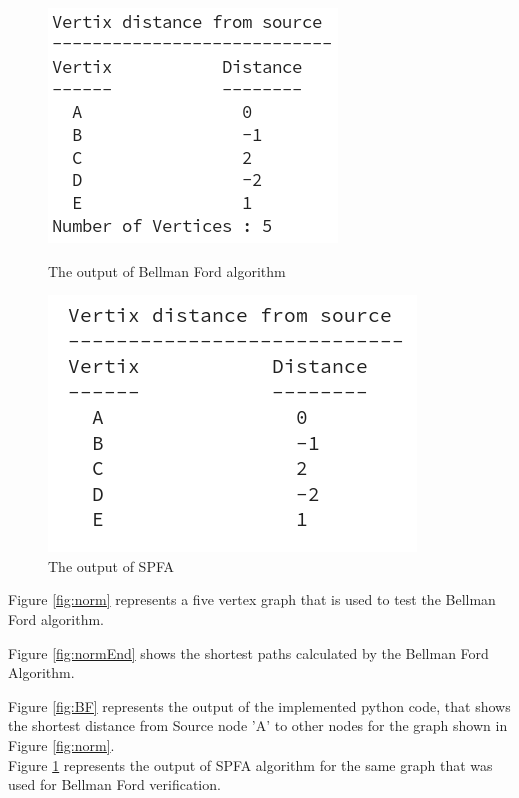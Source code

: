 \documentclass[12pt]{article}
\begin{document}
\begin{figure}[h]
	\centering
	\begin{minipage}{0.5\textwidth}
		\centering		
		\includegraphics[scale=0.5]{Figures/w1Output1.png}
		\caption{The output of Bellman Ford algorithm}
		\label{fig:BF}
	\end{minipage}%
	\begin{minipage}{0.5\textwidth}
		\centering
		\includegraphics[scale=0.45]{Figures/spfa.png}
		\caption{The output of SPFA}
		\label{fig:spfa}
	\end{minipage}	
\end{figure}

Figure \ref{fig:norm} represents a five vertex graph that is used to test the Bellman Ford algorithm. 

Figure \ref{fig:normEnd} shows the shortest paths calculated by the Bellman Ford Algorithm. 

Figure \ref{fig:BF} represents the output of the implemented python code, that shows the shortest distance from Source node 'A' to other nodes for the graph shown in Figure \ref{fig:norm}. \\

Figure \ref{fig:spfa} represents the output of SPFA algorithm for the same graph that was used for Bellman Ford verification.\\
\end{document}
